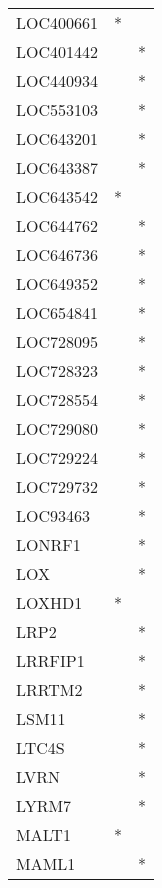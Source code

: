 \begin{longtable}{lcc}
LOC400661       &              * &            \\
LOC401442       &                &          * \\
LOC440934       &                &          * \\
LOC553103       &                &          * \\
LOC643201       &                &          * \\
LOC643387       &                &          * \\
LOC643542       &              * &            \\
LOC644762       &                &          * \\
LOC646736       &                &          * \\
LOC649352       &                &          * \\
LOC654841       &                &          * \\
LOC728095       &                &          * \\
LOC728323       &                &          * \\
LOC728554       &                &          * \\
LOC729080       &                &          * \\
LOC729224       &                &          * \\
LOC729732       &                &          * \\
LOC93463        &                &          * \\
LONRF1          &                &          * \\
LOX             &                &          * \\
LOXHD1          &              * &            \\
LRP2            &                &          * \\
LRRFIP1         &                &          * \\
LRRTM2          &                &          * \\
LSM11           &                &          * \\
LTC4S           &                &          * \\
LVRN            &                &          * \\
LYRM7           &                &          * \\
MALT1           &              * &            \\
MAML1           &                &          * \\

\end{longtable}
